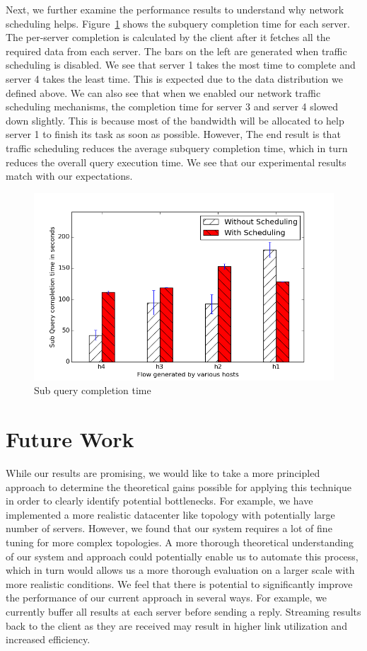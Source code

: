 \documentclass{acm_proc_article-sp}
\begin{document}
Next, we further examine the performance results to understand why network scheduling helps.
Figure~\ref{fig:sub_query_completion_8} shows the subquery completion time for each server.
The per-server completion is calculated by the client after it fetches all the required data from each server.
The bars on the left are generated when traffic scheduling is disabled.
We see that server 1 takes the most time to complete and server 4 takes the least time.
This is expected due to the data distribution we defined above.
We can also see that when we enabled our network traffic scheduling mechanisms, the completion time for server 3 and server 4 slowed down slightly.
This is because most of the bandwidth will be allocated to help server 1 to finish its task as soon as possible.
However, The end result is that traffic scheduling reduces the average subquery completion time, which in turn reduces the overall query execution time.
We see that our experimental results match with our expectations.

\begin{figure}
    \centering
    \includegraphics[scale=0.47]{figures/simple_topo_closer_8.png}
    \caption{Sub query completion time}\label{fig:sub_query_completion_8}
\end{figure}

\section{Future Work}

While our results are promising, we would like to take a more principled approach to determine the theoretical gains possible for applying this
technique in order to clearly identify potential bottlenecks.
For example, we have implemented a more realistic datacenter like topology with potentially large number of servers.
However, we found that our system requires a lot of fine tuning for more complex topologies.
A more thorough theoretical understanding of our system and approach could potentially enable us to automate this process, which in turn would allows us a more thorough evaluation on a larger scale with more realistic conditions.
We feel that there is potential to significantly improve the performance of our current approach in several ways.
For example, we currently buffer all results at each server before sending a reply.
Streaming results back to the client as they are received may result in higher link utilization and increased efficiency.
\end{document}
